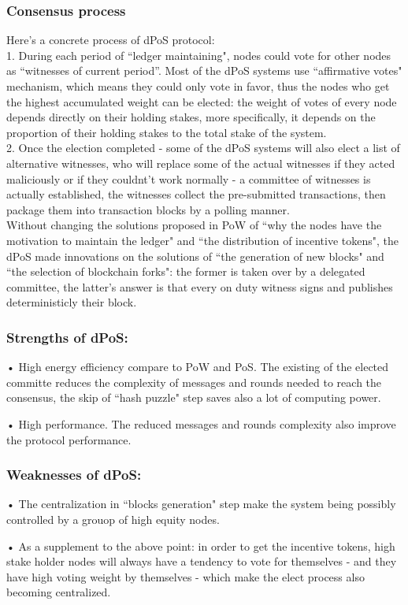 \documentclass[doublespacing]{bmcart}
\begin{document}
\begin{CJK*}{UTF8}{gbsn}
 \subsubsection*{Consensus process}
Here's a concrete process of dPoS protocol:
\\1. During each period of ``ledger maintaining", nodes could vote for other nodes as “witnesses of current period”. Most of the dPoS systems use ``affirmative votes" mechanism, which means they could only vote in favor, thus the nodes who get the highest accumulated weight can be elected: the weight of votes of every node depends directly on their holding stakes, more specifically, it depends on the proportion of their holding stakes to the total stake of the system.
\\2. Once the election completed - some of the dPoS systems will also elect a list of alternative witnesses, who will replace some of the actual witnesses if they acted maliciously or if they couldnt't work normally - a committee of witnesses is actually established, the witnesses collect the pre-submitted transactions, then package them into transaction blocks by a polling manner.
\\Without changing the solutions proposed in PoW of ``why the nodes have the motivation to maintain the ledger" and ``the distribution of incentive tokens", the dPoS made innovations on the solutions of ``the generation of new blocks" and ``the selection of blockchain forks": the former is taken over by a delegated committee, the latter's answer is that every on duty witness signs and publishes deterministicly their block.
\subsubsection*{Strengths of dPoS:}	
• High energy efficiency compare to PoW and PoS. The existing of the elected committe reduces the complexity of messages and rounds needed to reach the consensus, the skip of ``hash puzzle" step saves also a lot of computing power.
\par • High performance. The reduced messages and rounds complexity also improve the protocol performance. 
\subsubsection*{Weaknesses of dPoS:}	
• The centralization in ``blocks generation" step make the system being possibly controlled by a grouop of high equity nodes.
\par • As a supplement to the above point: in order to get the incentive tokens, high stake holder nodes will always have a tendency to vote for themselves - and they have high voting weight by themselves - which make the elect process also becoming centralized.
	

\end{CJK*}
\end{document}
